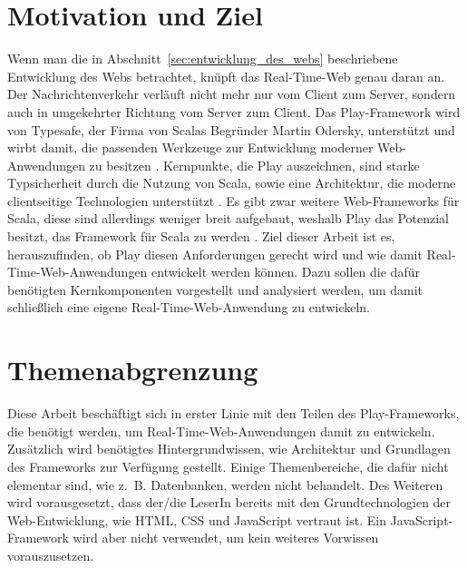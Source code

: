 

\section{Motivation und Ziel} %
\label{sec:motivation_und_ziel}

Wenn man die in Abschnitt~\ref{sec:entwicklung_des_webs} beschriebene Entwicklung des Webs betrachtet, knüpft das Real-Time-Web genau daran an.
Der Nachrichtenverkehr verläuft nicht mehr nur vom Client zum Server, sondern auch in umgekehrter Richtung vom Server zum Client.
Das Play-Framework wird von Typesafe, der Firma von Scalas Begründer Martin Odersky, unterstützt und wirbt damit, die passenden Werkzeuge zur Entwicklung moderner Web-Anwendungen zu besitzen \cite[vgl.][]{play}.
Kernpunkte, die Play auszeichnen, sind starke Typsicherheit durch die Nutzung von Scala, sowie eine Architektur, die moderne clientseitige Technologien unterstützt \cite[vgl.][S.~4]{play_for_scala}.
Es gibt zwar weitere Web-Frameworks für Scala, diese sind allerdings weniger breit aufgebaut, weshalb Play das Potenzial besitzt, das Framework für Scala zu werden \cite[vgl.][S.~8]{play_for_scala}.
Ziel dieser Arbeit ist es, herauszufinden, ob Play diesen Anforderungen gerecht wird und wie damit Real-Time-Web-Anwendungen entwickelt werden können.
Dazu sollen die dafür benötigten Kernkomponenten vorgestellt und analysiert werden, um damit schließlich eine eigene Real-Time-Web-Anwendung zu entwickeln.



\section{Themenabgrenzung} %
\label{sec:themenabgrenzung}

Diese Arbeit beschäftigt sich in erster Linie mit den Teilen des Play-Frameworks, die benötigt werden, um Real-Time-Web-Anwendungen damit zu entwickeln.
Zusätzlich wird benötigtes Hintergrundwissen, wie Architektur und Grundlagen des Frameworks zur Verfügung gestellt.
Einige Themenbereiche, die dafür nicht elementar sind, wie z.~B. Datenbanken, werden nicht behandelt.
Des Weiteren wird vorausgesetzt, dass der/die LeserIn bereits mit den Grundtechnologien der Web-Entwicklung, wie HTML, CSS und JavaScript vertraut ist.
Ein JavaScript-Framework wird aber nicht verwendet, um kein weiteres Vorwissen vorauszusetzen.



